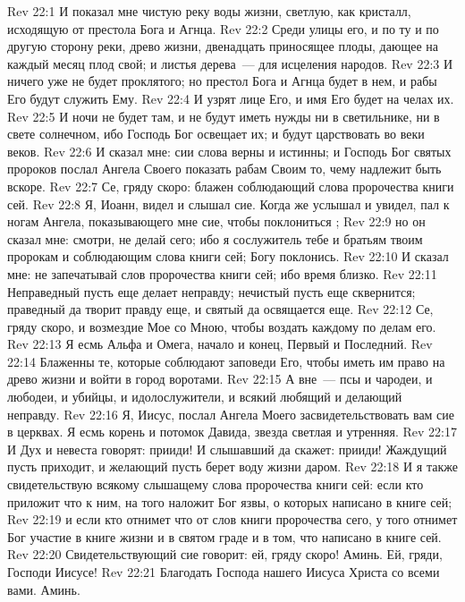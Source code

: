 \vs Rev 22:1 И показал мне чистую реку воды жизни, светлую, как кристалл, исходящую от престола Бога и Агнца.
\vs Rev 22:2 Среди улицы его, и по ту и по другую сторону реки, древо жизни, двенадцать  приносящее плоды, дающее на каждый месяц плод свой; и листья дерева~--- для исцеления народов.
\vs Rev 22:3 И ничего уже не будет проклятого; но престол Бога и Агнца будет в нем, и рабы Его будут служить Ему.
\vs Rev 22:4 И узрят лице Его, и имя Его будет на челах их.
\vs Rev 22:5 И ночи не будет там, и не будут иметь нужды ни в светильнике, ни в свете солнечном, ибо Господь Бог освещает их; и будут царствовать во веки веков.
\rsbpar\vs Rev 22:6 И сказал мне: сии слова верны и истинны; и Господь Бог святых пророков послал Ангела Своего показать рабам Своим то, чему надлежит быть вскоре.
\vs Rev 22:7 Се, гряду скоро: блажен соблюдающий слова пророчества книги сей.
\rsbpar\vs Rev 22:8 Я, Иоанн, видел и слышал сие. Когда же услышал и увидел, пал к ногам Ангела, показывающего мне сие, чтобы поклониться ;
\vs Rev 22:9 но он сказал мне: смотри, не делай сего; ибо я сослужитель тебе и братьям твоим пророкам и соблюдающим слова книги сей; Богу поклонись.
\vs Rev 22:10 И сказал мне: не запечатывай слов пророчества книги сей; ибо время близко.
\vs Rev 22:11 Неправедный пусть еще делает неправду; нечистый пусть еще сквернится; праведный да творит правду еще, и святый да освящается еще.
\vs Rev 22:12 Се, гряду скоро, и возмездие Мое со Мною, чтобы воздать каждому по делам его.
\vs Rev 22:13 Я есмь Альфа и Омега, начало и конец, Первый и Последний.
\vs Rev 22:14 Блаженны те, которые соблюдают заповеди Его, чтобы иметь им право на древо жизни и войти в город воротами.
\vs Rev 22:15 А вне~--- псы и чародеи, и любодеи, и убийцы, и идолослужители, и всякий любящий и делающий неправду.
\rsbpar\vs Rev 22:16 Я, Иисус, послал Ангела Моего засвидетельствовать вам сие в церквах. Я есмь корень и потомок Давида, звезда светлая и утренняя.
\rsbpar\vs Rev 22:17 И Дух и невеста говорят: прииди! И слышавший да скажет: прииди! Жаждущий пусть приходит, и желающий пусть берет воду жизни даром.
\rsbpar\vs Rev 22:18 И я также свидетельствую всякому слышащему слова пророчества книги сей: если кто приложит что к ним, на того наложит Бог язвы, о которых написано в книге сей;
\vs Rev 22:19 и если кто отнимет что от слов книги пророчества сего, у того отнимет Бог участие в книге жизни и в святом граде и в том, что написано в книге сей.
\rsbpar\vs Rev 22:20 Свидетельствующий сие говорит: ей, гряду скоро! Аминь. Ей, гряди, Господи Иисусе!
\rsbpar\vs Rev 22:21 Благодать Господа нашего Иисуса Христа со всеми вами. Аминь.
